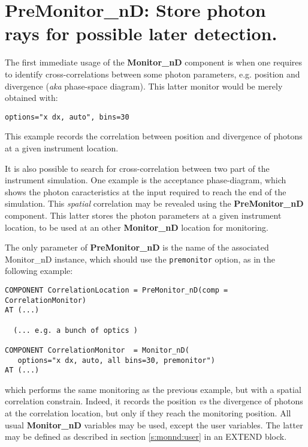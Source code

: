 \section{PreMonitor\_nD: Store photon rays for possible later detection.}

The first immediate usage of the \textbf{Monitor\_nD} component is when one requires to
identify cross-correlations between some photon parameters, e.g. position and
divergence (\textit{aka} phase-space diagram). This latter monitor would be
merely obtained with:
\begin{verbatim}
options="x dx, auto", bins=30
\end{verbatim}
This example records the correlation between position and divergence of photons at a given instrument location.

It is also possible to search for cross-correlation between two part of the
instrument simulation. One example is the acceptance phase-diagram, which shows
the photon caracteristics at the input required to reach the end of the
simulation. This \emph{spatial} correlation may be revealed using the
\textbf{PreMonitor\_nD} component. This latter stores the photon parameters at
a given instrument location, to be used at an other \textbf{Monitor\_nD} location for
monitoring.

The only parameter of \textbf{PreMonitor\_nD} is the name of the associated
Monitor\_nD instance, which should use the \verb+premonitor+ option, as in the
following example:
\begin{verbatim}
COMPONENT CorrelationLocation = PreMonitor_nD(comp = CorrelationMonitor)
AT (...)

  (... e.g. a bunch of optics )

COMPONENT CorrelationMonitor  = Monitor_nD(
   options="x dx, auto, all bins=30, premonitor")
AT (...)
\end{verbatim}
which performs the same monitoring as the previous example, but with a spatial
correlation constrain. Indeed, it records the position \textit{vs} the
divergence of photons at the correlation location, but only if they reach the
monitoring position. All usual \textbf{Monitor\_nD} variables may be used, except the
user variables. The latter may be defined as described in section
\ref{s:monnd:user} in an EXTEND block.
